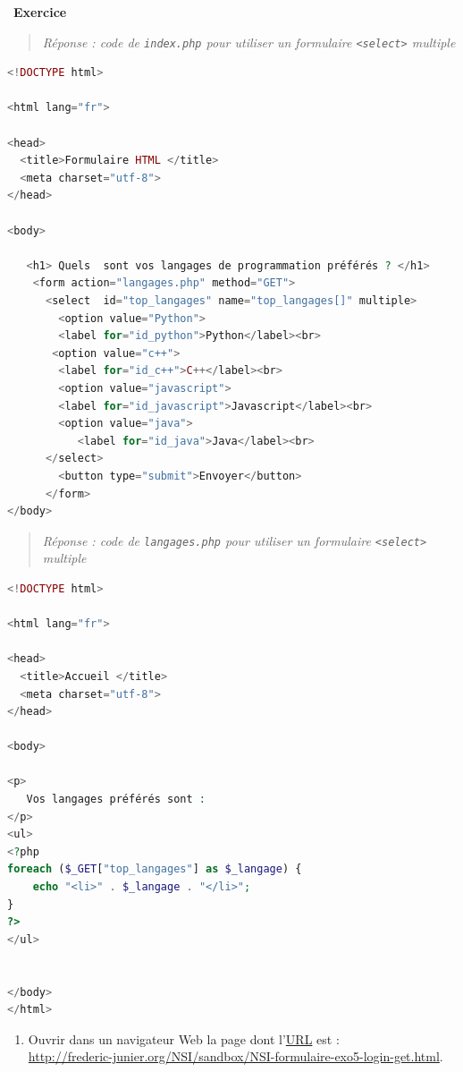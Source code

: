 \documentclass[
  11pt,
]{article}
\newcommand{\passthrough}[1]{#1}
\providecommand{\tightlist}{%
  \setlength{\itemsep}{0pt}\setlength{\parskip}{0pt}}
\newcounter{exo}
\newenvironment{exercice}[1]
{\par \medskip   \addtocounter{exo}{1} \noindent  
\begin{bclogo}[arrondi =0.1,   noborder = true, logo=\bccrayon, marge=4]{~\textbf{Exercice} \textbf{\theexo} {\itshape #1} }  \par}
{
\end{bclogo}
 \par \bigskip }
\newcounter{def}
\newcounter{prog}
\newcounter{logi}
\begin{document}
\begin{exercice}{}
\begin{quote}
\emph{Réponse : code de \passthrough{\lstinline!index.php!} pour
utiliser un formulaire \passthrough{\lstinline!<select>!} multiple}
\end{quote}

\begin{lstlisting}[language=PHP]
<!DOCTYPE html>

<html lang="fr">

<head>
  <title>Formulaire HTML </title>
  <meta charset="utf-8">    
</head>
 
<body>

   <h1> Quels  sont vos langages de programmation préférés ? </h1>
    <form action="langages.php" method="GET">
      <select  id="top_langages" name="top_langages[]" multiple>
        <option value="Python">
        <label for="id_python">Python</label><br>
       <option value="c++">
        <label for="id_c++">C++</label><br>
        <option value="javascript">
        <label for="id_javascript">Javascript</label><br>
        <option value="java">
           <label for="id_java">Java</label><br>
      </select>
        <button type="submit">Envoyer</button>
      </form> 
</body>
\end{lstlisting}

\begin{quote}
\emph{Réponse : code de \passthrough{\lstinline!langages.php!} pour
utiliser un formulaire \passthrough{\lstinline!<select>!} multiple}
\end{quote}

\begin{lstlisting}[language=PHP]
<!DOCTYPE html>

<html lang="fr">

<head>
  <title>Accueil </title>
  <meta charset="utf-8">    
</head>
 
<body>

<p>
   Vos langages préférés sont :
</p>
<ul>
<?php 
foreach ($_GET["top_langages"] as $_langage) {
    echo "<li>" . $_langage . "</li>";
}
?>
</ul>


</body>
</html> 
\end{lstlisting}

\begin{enumerate}
\def\labelenumi{\arabic{enumi}.}
\setcounter{enumi}{3}
\tightlist
\item
  Ouvrir dans un navigateur Web la page dont
  l'\href{https://developer.mozilla.org/fr/docs/Glossaire/URL}{URL} est
  :\\
  \url{http://frederic-junier.org/NSI/sandbox/NSI-formulaire-exo5-login-get.html}.


\end{enumerate}
\end{exercice}
\end{document}
